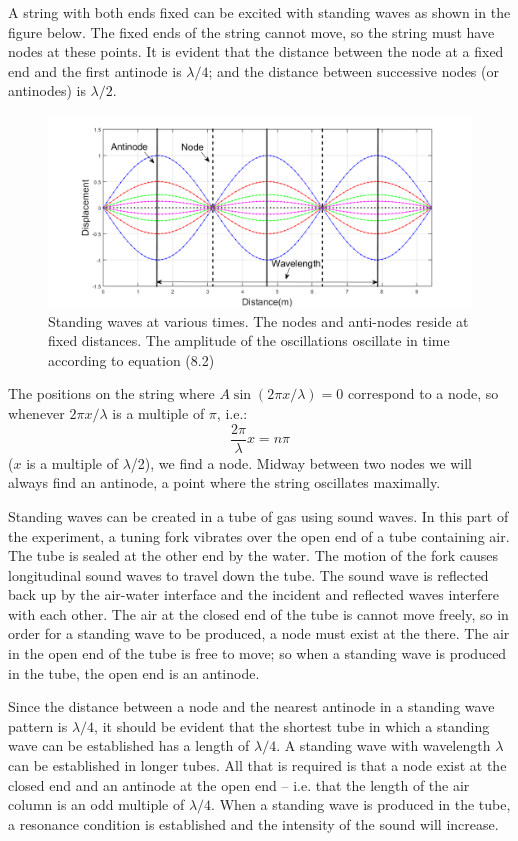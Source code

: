 A string with both ends fixed can be excited with standing waves as shown in the figure below. The fixed ends of the string cannot move, so the string must have nodes at these points. It is evident that the distance between the node at a fixed end and the first antinode is $\lambda /4$; and the distance between successive nodes (or antinodes) is $\lambda /2$.\myskip
\begin{figure}[h]
\centering
\includegraphics[width=1.0\textwidth]{./Exp1-9/pic/page04.png}
\caption{Standing waves at various times. The nodes and anti-nodes reside at fixed distances. The amplitude of the oscillations oscillate in time according to equation (8.2)}
\end{figure}

 The positions on the string where $A\sin(2\pi x/\lambda) = 0$ correspond to a node, so whenever $2\pi x/\lambda$ is a multiple of $\pi$, i.e.:
 \begin{equation}
   \frac{2\pi}{\lambda}x=n\pi
 \end{equation}
($x$ is a multiple of $\lambda$/2), we find a node. Midway between two nodes we will always find an antinode, a point where the string oscillates maximally.

Standing waves can be created in a tube of gas using sound waves. In this part of the experiment, a tuning fork vibrates over the open end of a tube containing air. The tube is sealed at the other end by the water. The motion of the fork causes longitudinal sound waves to travel down the tube. The sound wave is reflected back up by the air-water interface and the incident and reflected waves interfere with each other. The air at the closed end of the tube is cannot move freely, so in order for a standing wave to be produced, a node must exist at the there. The air in the open end of the tube is free to move; so when a standing wave is produced in the tube, the open end is an antinode.\myskip

Since the distance between a node and the nearest antinode in a standing wave pattern is $\lambda/4$, it should be evident that the shortest tube in which a standing wave can be established has a length of $\lambda/4$. A standing wave with wavelength $\lambda$ can be established in longer tubes. All that is required is that a node exist at the closed end and an antinode at the open end -- i.e. that the length of the air column is an odd multiple of $\lambda/4$. When a standing wave is produced in the tube, a resonance condition is established and the intensity of the sound will increase.

